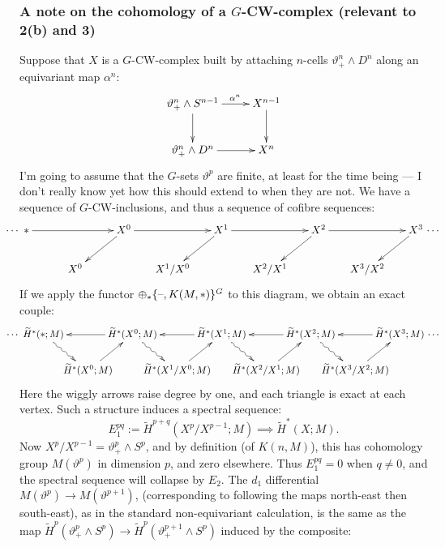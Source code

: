 \documentclass[11pt]{article}
\begin{document}
\subsubsection*{A note on the cohomology of a $G$-CW-complex (relevant to 2(b) and 3)}
Suppose that $X$ is a $G$-CW-complex built by attaching $n$-cells $\vartheta^n_+\wedge D^n$ along an equivariant map $\alpha^n$:
\[\xymatrix{
\vartheta^n_+\wedge S^{n-1}\ar[d]\ar[r]^{\quad\alpha^n}&X^{n-1}\ar[d]\\
\vartheta^n_+\wedge D^{n}\ar[r]&X^{n}
}\]
I'm going to assume that the $G$-sets $\vartheta^p$ are finite, at least for the time being --- I don't really know yet how this should extend to when they are not.
We have a sequence of $G$-CW-inclusions, and thus a sequence of cofibre sequences:
\[\xymatrix@!0@C=1.6cm@R=1.28cm{%
\makebox[0cm][r]{$\cdots$\
}\ast\ar[rr]&&X^0\ar[rr]\ar[ld]&&X^1\ar[rr]
\ar[ld]&&X^2\ar[ld]
\ar[rr]&&X^3\makebox[0cm][l]{\ $\cdots$}\ar[ld]\\
&X^0&&%
X^1/X^0&&%
X^2/X^1&&%
X^3/X^2%
}\]
If we apply the functor $\oplus_{*}\{\textup{--},K(M,*)\}^G$ to this diagram, we obtain an exact couple:
\[\xymatrix@!0@C=1.6cm@R=1.28cm{%
\makebox[0cm][r]{$\cdots$\
}\widetilde H^*(\ast;M)\ar[rr];[]&&\widetilde H^*(X^0;M)\ar[rr];[]\ar[ld];[]&&\widetilde H^*(X^1;M)\ar[rr];[]
\ar[ld];[]&&\widetilde H^*(X^2;M)\ar[ld];[]
\ar[rr];[]&&\widetilde H^*(X^3;M)\makebox[0cm][l]{\ $\cdots$}\ar[ld];[]\\
&\widetilde H^*(X^0;M)\ar@{~>}[ul];[]&&
\widetilde H^*(X^1/X^0;M)\ar@{~>}[lu];[]&&
\widetilde H^*(X^2/X^1;M)\ar@{~>}[lu];[]&&
\widetilde H^*(X^3/X^2;M)\ar@{~>}[lu];[]
}\]
Here the wiggly arrows raise degree by one, and each triangle is exact at each vertex. Such a structure induces a spectral sequence:
\[E_1^{pq}:=\widetilde H^{p+q}(X^p/X^{p-1};M)\implies\widetilde H^*(X;M).\]
Now $X^p/X^{p-1}=\vartheta^p_+\wedge S^p$, and by definition (of $K(n,M)$), this has cohomology group $M(\vartheta^p)$ in dimension $p$, and zero elsewhere. Thus $E_1^{pq}=0$ when $q\neq0$, and the spectral sequence will collapse by $E_2$. The $d_1$ differential $M(\vartheta^p)\to M(\vartheta^{p+1})$, (corresponding to following the maps north-east then south-east), as in the standard non-equivariant calculation, is the same as the map $\widetilde H^p(\vartheta^{p}_+\wedge S^{p})\to\widetilde H^p(\vartheta^{p+1}_+\wedge S^{p})$ induced by the composite:
\end{document}
